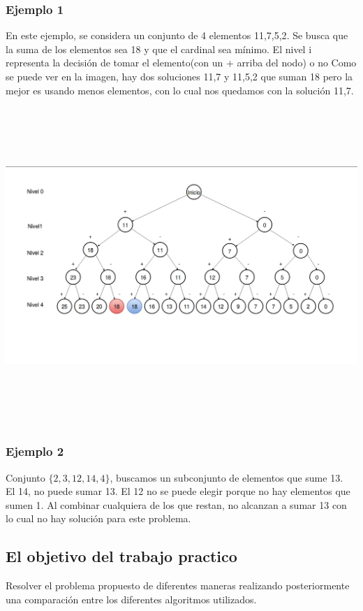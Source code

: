 \subsubsection{Ejemplo 1}
En este ejemplo, se considera un conjunto de 4 elementos {11,7,5,2}.
Se busca que la suma de los elementos sea 18 y que el cardinal sea mínimo.
El nivel i representa la decisión de tomar el elemento(con un + arriba del nodo) o no
Como se puede ver en la imagen, hay dos soluciones {11,7} y {11,5,2} que suman 18 pero
la mejor es usando menos elementos, con lo cual nos quedamos con la solución {11,7}.
\begin{center}
\includegraphics[width=18cm, height=12cm]{diagrama.png}
\end{center}
\newpage
\subsubsection{Ejemplo 2}
Conjunto $\{2, 3, 12, 14, 4\}$, buscamos un subconjunto de elementos que sume 13.\\
El 14, no puede sumar 13. El 12 no se puede elegir porque no hay elementos que sumen 1. Al combinar cualquiera de los que restan, no alcanzan a sumar 13 con lo cual no hay soluci\'on para este problema.\\


\subsection{El objetivo del trabajo practico}
 Resolver el problema propuesto de diferentes maneras realizando posteriormente una comparaci\'on entre los diferentes algoritmos utilizados.